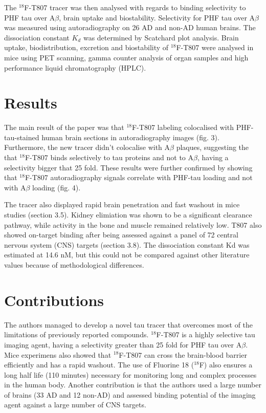 \documentclass[11pt,a4paper,oneside]{report}
\begin{document}
The $^{18}$F-T807 tracer was then analysed with regards to binding selectivity to PHF tau over A$\beta$, brain uptake and biostability. Selectivity for PHF tau over A$\beta$ was measured using autoradiography on 26 AD and non-AD human brains. The dissociation constant $K_d$ was determined by Scatchard plot analysis. Brain uptake, biodistribution, excretion and biostability of $^{18}$F-T807 were analysed in mice using PET scanning, gamma counter analysis of organ samples and high performance liquid chromatography (HPLC).


\section*{Results}

The main result of the paper was that $^{18}$F-T807 labeling colocalised with PHF-tau-stained human brain sections in autoradiography images (fig. 3). Furthermore, the new tracer didn't colocalise with A$\beta$ plaques, suggesting the that $^{18}$F-T807 binds selectively to tau proteins and not to A$\beta$, having a selectivity bigger that 25 fold. These results were further confirmed by showing that $^{18}$F-T807 autoradiography signals correlate with PHF-tau loading and not with A$\beta$ loading (fig. 4). 

The tracer also displayed rapid brain penetration and fast washout in mice studies (section 3.5). Kidney elimiation was shown to be a significant clearance pathway, while activity in the bone and muscle remained relatively low. T807 also showed on-target binding after being assessed against a panel of 72 central nervous system (CNS) targets (section 3.8). The dissociation constant Kd was estimated at 14.6 nM, but this could not be compared against other literature values because of methodological differences.

\section*{Contributions}

The authors managed to develop a novel tau tracer that overcomes most of the limitations of previously reported compounds. $^{18}$F-T807 is a highly selective tau imaging agent, having a selectivity greater than 25 fold for PHF tau over A$\beta$. Mice experimens also showed that $^{18}$F-T807 can cross the brain-blood barrier efficiently and has a rapid washout. The use of Fluorine 18 ($^{18}$F) also ensures a long half life (110 minutes) necessary for monitoring long and complex processes in the human body. Another contribution is that the authors used a large number of brains (33 AD and 12 non-AD) and assessed binding potential of the imaging agent against a large number of CNS targets. 
\end{document}
